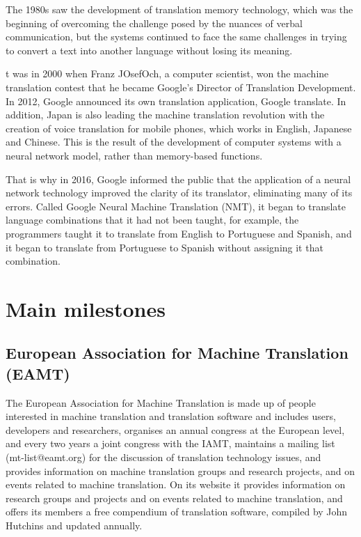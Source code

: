 \documentclass[a4paper]{article}
\theoremstyle{plain}
\theoremstyle{definition}
\begin{document}
\begin{flushleft}
    The 1980s saw the development of translation memory technology, which was the beginning of overcoming the challenge posed by the nuances of verbal communication, but the systems continued to face the same challenges in trying to convert a text into another language without losing its meaning.\par
    
    t was in 2000 when Franz JOsefOch, a computer scientist, won the machine translation contest that he became Google's Director of Translation Development. In 2012, Google announced its own translation application, Google translate. In addition, Japan is also leading the machine translation revolution with the creation of voice translation for mobile phones, which works in English, Japanese and Chinese. This is the result of the development of computer systems with a neural network model, rather than memory-based functions.\par
    
    That is why in 2016, Google informed the public that the application of a neural network technology improved the clarity of its translator, eliminating many of its errors. Called Google Neural Machine Translation (NMT), it began to translate language combinations that it had not been taught, for example, the programmers taught it to translate from English to Portuguese and Spanish, and it began to translate from Portuguese to Spanish without assigning it that combination.\par

	\end{flushleft}
	
	
	
	
	
    \section{Main milestones}
	\label{sec:examples}
	
	
	
	\subsection{European Association for Machine Translation (EAMT)}
	\begin{flushleft}
	The European Association for Machine Translation is made up of people interested in machine translation and translation software and includes users, developers and researchers, organises an annual congress at the European level, and every two years a joint congress with the IAMT, maintains a mailing list (mt-list@eamt.org) for the discussion of translation technology issues, and provides information on machine translation groups and research projects, and on events related to machine translation. On its website it provides information on research groups and projects and on events related to machine translation, and offers its members a free compendium of translation software, compiled by John Hutchins and updated annually.
	\end{flushleft}
\end{document}
